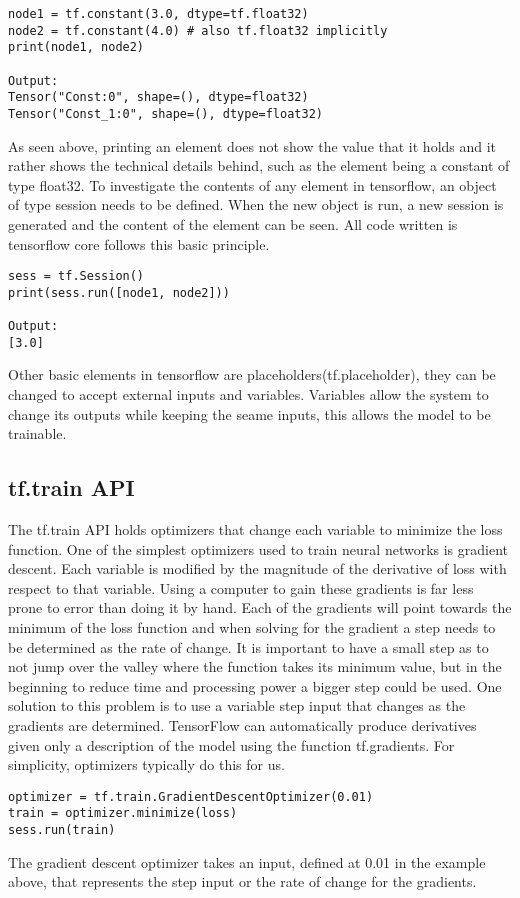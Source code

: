 \begin{lstlisting}
node1 = tf.constant(3.0, dtype=tf.float32)
node2 = tf.constant(4.0) # also tf.float32 implicitly
print(node1, node2)

Output:
Tensor("Const:0", shape=(), dtype=float32)
Tensor("Const_1:0", shape=(), dtype=float32) 
\end{lstlisting}

As seen above, printing an element does not show the value that it holds and it rather shows the technical details behind,
such as the element being a constant of type float32.
To investigate the contents of any element in tensorflow,
an object of type session needs to be defined.
When the new object is run, a new session is generated and the content of the element can be seen.
All code written is tensorflow core follows this basic principle.

\begin{lstlisting}
sess = tf.Session()
print(sess.run([node1, node2]))

Output:
[3.0]
\end{lstlisting}

Other basic elements in tensorflow are placeholders(tf.placeholder), 
they can be changed to accept external inputs and variables.
Variables allow the system to change its outputs while keeping the seame inputs, this allows the model to be trainable. 

\subsection{tf.train API}
The tf.train API holds optimizers that change each variable to minimize the loss function.
One of the simplest optimizers used to train neural networks is gradient descent.
Each variable is modified by the magnitude of the derivative of loss with respect to that variable.
Using a computer to gain these gradients is far less prone to error than doing it by hand.
Each of the gradients will point towards the minimum of the loss function and when solving for the gradient a step needs to be determined as the rate of change.
It is important to  have a small step as to not jump over the valley where the function takes its minimum value,
but in the beginning to reduce time and processing power a bigger step could be used.
One solution to this problem is to use a variable step input that changes as the gradients are determined.
TensorFlow can automatically produce derivatives given only a description of the model using the function tf.gradients.
For simplicity, optimizers typically do this for us.
\begin{lstlisting}
optimizer = tf.train.GradientDescentOptimizer(0.01)
train = optimizer.minimize(loss)
sess.run(train)
\end{lstlisting}
The gradient descent optimizer takes an input, defined at 0.01 in the example above,
that represents the step input or the rate of change for the gradients.

